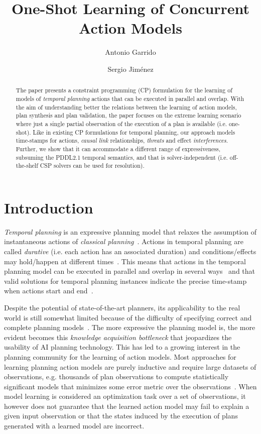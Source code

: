 \documentclass{ecai}
\begin{document}
\title{One-Shot Learning of Concurrent Action Models}
\author{Antonio Garrido \and Sergio Jim\'enez}
 
\maketitle

\begin{abstract}
  The paper presents a constraint programming (CP) formulation for the learning of models of {\em temporal planning} actions that can be executed in parallel and overlap. With the aim of understanding better the relations between the learning of action models, plan synthesis and plan validation, the paper focuses on the extreme learning scenario where just a single partial observation of the execution of a plan is available (i.e. one-shot). Like in existing CP formulations for temporal planning, our approach models time-stamps for actions, {\em causal link} relationships, {\em threats} and effect {\em interferences}. Further, we show that it can accommodate a different range of expressiveness, subsuming the PDDL2.1 temporal semantics, and that is solver-independent (i.e. off-the-shelf CSP solvers can be used for resolution).   
\end{abstract}


\section{Introduction}
{\em Temporal planning} is an expressive planning model that relaxes the assumption of instantaneous actions of {\em classical planning}~\cite{geffner2013concise}. Actions in temporal planning are called {\em durative} (i.e. each action has an associated duration) and conditions/effects may hold/happen at different times~\cite{fox2003pddl2}. This means that actions in the temporal planning model can be executed in parallel and overlap in several ways~\cite{cushing2007temporal} and that valid solutions for temporal planning instances indicate the precise time-stamp when actions start and end~\cite{howey2004val}.

Despite the potential of state-of-the-art planners, its applicability to the real world is still somewhat limited because of the difficulty of specifying correct and complete planning models~\cite{kambhampati2007model}. The more expressive the planning model is, the more evident becomes this {\em knowledge acquisition bottleneck} that jeopardizes the usability of AI planning technology. This has led to a growing interest in the planning community for the learning of action models. Most approaches for learning planning action models are purely inductive and require large datasets of observations, e.g. thousands of plan observations to compute statistically significant models that minimizes some error metric over the observations~\cite{yang2007learning,MouraoZPS12,zhuo2013action,kuvcera2018louga}. When model learning is considered an optimization task over a set of observations, it however does not guarantee that the learned action model may fail to explain a given input observation or that the states induced by the execution of plans generated with a learned model are incorrect.
\end{document}

